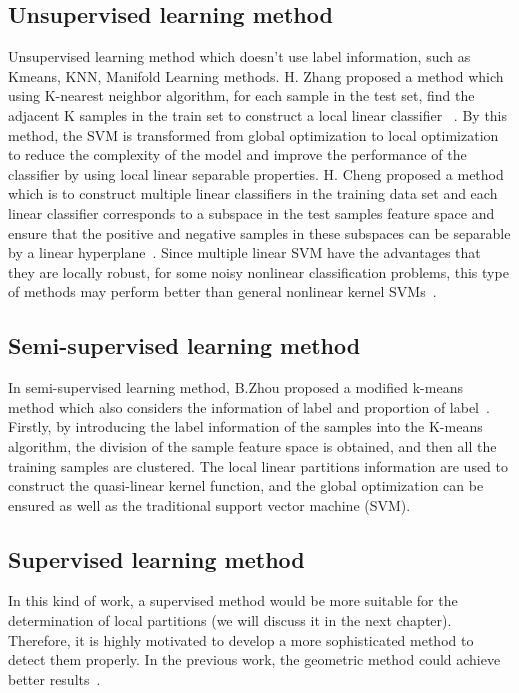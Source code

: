 \documentclass[master]{IPSstyle}
\begin{document}
\subsection{Unsupervised learning method}
Unsupervised learning method which doesn’t use label information, such as Kmeans, KNN, Manifold Learning methods.
H. Zhang proposed a method which using K-nearest neighbor algorithm, for each sample in the test set, find the adjacent K samples in the train set to construct a local linear classifier~\cite{zhang2006svm} . By this method, the SVM is transformed from global optimization to local optimization to reduce the complexity of the model and improve the performance of the classifier by using local linear separable properties. H. Cheng proposed a method which is to construct multiple linear classifiers in the training data set and each linear classifier corresponds to a subspace in the test samples feature space and ensure that the positive and negative samples in these subspaces can be separable by a linear hyperplane~\cite{cheng2010efficient}.
Since multiple linear SVM have the advantages that they are locally robust, for some noisy nonlinear classification problems, this type of methods may perform better than general nonlinear kernel SVMs~\cite{li2014growing}.

\subsection{Semi-supervised learning method}
In semi-supervised learning method, B.Zhou proposed a modified k-means method which also considers the information of label and proportion of label~\cite{bo2014quasi}. Firstly, by introducing the label information of the samples into the K-means algorithm, the division of the sample feature space is obtained, and then all the training samples are clustered. The local linear partitions information are used to construct the quasi-linear kernel function, and the global optimization can be ensured as well as the traditional support vector machine (SVM). 

\subsection{Supervised learning method}
In this kind of work, a supervised method would be more suitable for the determination of local partitions (we will discuss it in the next chapter). Therefore, it is highly motivated to develop a more sophisticated method to detect them properly. In the previous work, the geometric method could achieve better results~\cite{li2015geometric}.
\end{document}

